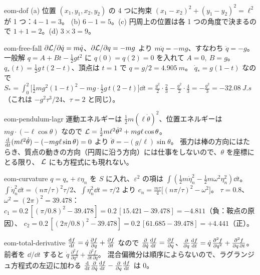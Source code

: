 \begin{solution}{eom-dof}
(a) 位置 $(x_1,y_1,x_2,y_2)$ の 4 つに拘束 $(x_1-x_2)^2+(y_1-y_2)^2=\ell^2$ が 1 つ：$4-1=3$。
(b) $6-1=5$。(c) 円周上の位置は各 1 つの角度で決まるので $1+1=2$。(d) $3\times3=9$。
\end{solution}

\begin{solution}{eom-free-fall}
$\partial\mathcal{L}/\partial\dot q=m\dot q$、$\partial\mathcal{L}/\partial q=-mg$ より $m\ddot q=-mg$、すなわち $\ddot q=-g$。
一般解 $q=A+Bt-\tfrac12gt^2$ に $q(0)=q(2)=0$ を入れて $A=0,\ B=g$。
$q_*(t)=\tfrac12g\,t(2-t)$、頂点は $t=1$ で $q=g/2=\qty{4.905}{m}$。
$\dot q_*=g(1-t)$ なので $S_*=\int_0^2\bigl[\tfrac12mg^2(1-t)^2-mg\cdot\tfrac12g\,t(2-t)\bigr]\dd t
=\tfrac{g^2}{2}\cdot\tfrac23-\tfrac{g^2}{2}\cdot\tfrac43=-\tfrac{g^2}3=-\qty{32.08}{J.s}$
（これは $-g^2\tau^3/24$、$\tau=2$ と同じ）。
\end{solution}

\begin{solution}{eom-pendulum-lagr}
運動エネルギーは $\tfrac12m(\ell\dot\theta)^2$、位置エネルギーは $mg\cdot(-\ell\cos\theta)$ なので
$\mathcal{L}=\tfrac12m\ell^2\dot\theta^2+mg\ell\cos\theta$。
$\frac{\mathrm{d} }{\mathrm{d} t}(m\ell^2\dot\theta)-(-mg\ell\sin\theta)=0$ より $\ddot\theta=-(g/\ell)\sin\theta$。
張力は棒の方向にはたらき、質点の動きの方向（円周に沿う方向）には仕事をしないので、$\theta$ を座標にとる限り、
$\mathcal{L}$ にも方程式にも現れない。
\end{solution}

\begin{solution}{eom-curvature}
$q=q_*+\varepsilon\eta_n$ を $S$ に入れ、$\varepsilon^2$ の項は $\int(\tfrac12m\dot\eta_n^2-\tfrac12m\omega^2\eta_n^2)\dd t$。
$\int\dot\eta_n^2\dd t=(n\pi/\tau)^2\tau/2$、$\int\eta_n^2\dd t=\tau/2$ より
$c_n=\tfrac{m\tau}4\bigl[(n\pi/\tau)^2-\omega^2\bigr]$。
$\tau=0.8$、$\omega^2=(2\pi)^2=39.478$：
$c_1=0.2\,[(\pi/0.8)^2-39.478]=0.2\,[15.421-39.478]=-4.811$（負：鞍点の原因）、
$c_2=0.2\,[(2\pi/0.8)^2-39.478]=0.2\,[61.685-39.478]=+4.441$（正）。
\end{solution}

\begin{solution}{eom-total-derivative}
$\tfrac{\mathrm{d} f}{\mathrm{d} t}=\dot q\,\frac{\partial f}{\partial q}+\frac{\partial f}{\partial t}$ なので
$\frac{\partial }{\partial \dot q}\frac{\mathrm{d} f}{\mathrm{d} t}=\frac{\partial f}{\partial q}$、$\frac{\partial }{\partial q}\frac{\mathrm{d} f}{\mathrm{d} t}=\dot q\,\frac{\partial^2f}{\partial q^2}+\frac{\partial^2f}{\partial q\,\partial t}$。
前者を $\dd/\dd t$ すると $\dot q\,\frac{\partial^2f}{\partial q^2}+\frac{\partial^2f}{\partial t\,\partial q}$。
混合偏微分は順序によらないので、ラグランジュ方程式の左辺に加わる $\tfrac{\mathrm{d}}{\mathrm{d} t}\frac{\partial }{\partial \dot q}\tfrac{\mathrm{d} f}{\mathrm{d} t}-\frac{\partial }{\partial q}\tfrac{\mathrm{d} f}{\mathrm{d} t}$ は 0。
\end{solution}

